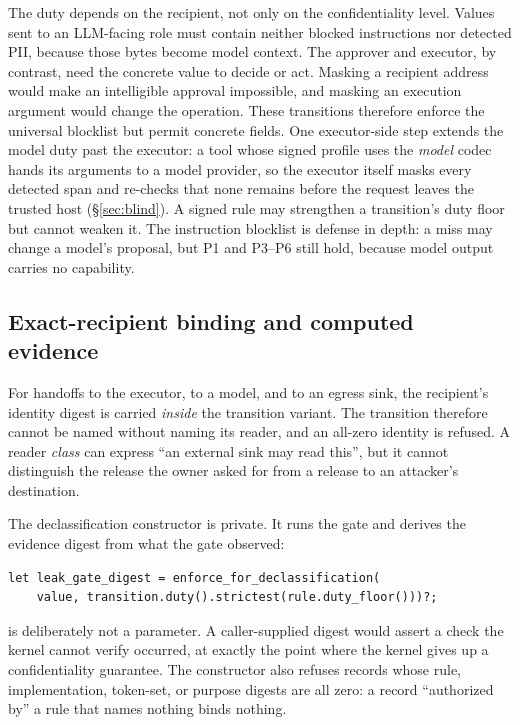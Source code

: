 \documentclass[letterpaper,twocolumn,10pt]{article}
\newcommand{\code}[1]{\texttt{\detokenize{#1}}}
\begin{document}
The duty depends on the recipient, not only on the confidentiality level.
Values sent to an LLM-facing role must contain neither blocked
instructions nor detected PII, because those bytes become model context.
The approver and executor, by contrast, need the concrete value to decide
or act. Masking a recipient address would make an intelligible approval
impossible, and masking an execution argument would change the operation.
These transitions therefore enforce the universal blocklist but permit
concrete fields. One executor-side step extends the model duty past the
executor: a tool whose signed profile uses the \emph{model} codec hands
its arguments to a model provider, so the executor itself masks every
detected span and re-checks that none remains before the request leaves
the trusted host (\S\ref{sec:blind}). A signed rule may strengthen a
transition's duty floor but cannot weaken it. The instruction blocklist is defense in depth: a miss may
change a model's proposal, but P1 and P3--P6 still hold, because model
output carries no capability.

\subsection{Exact-recipient binding and computed evidence}

For handoffs to the executor, to a model, and to an egress sink, the
recipient's identity digest is carried \emph{inside} the transition
variant. The transition therefore cannot be named without naming its
reader, and an all-zero identity is refused. A reader \emph{class} can
express ``an external sink may read this'', but it cannot distinguish the
release the owner asked for from a release to an attacker's destination.

The declassification constructor is private. It runs the gate and derives
the evidence digest from what the gate observed:
\begin{lstlisting}
let leak_gate_digest = enforce_for_declassification(
    value, transition.duty().strictest(rule.duty_floor()))?;
\end{lstlisting}
\code{leak_gate_digest} is deliberately not a parameter. A caller-supplied
digest would assert a check the kernel cannot verify occurred, at exactly
the point where the kernel gives up a confidentiality guarantee. The
constructor also refuses records whose rule, implementation, token-set, or
purpose digests are all zero: a record ``authorized by'' a rule that names
nothing binds nothing.
\end{document}

